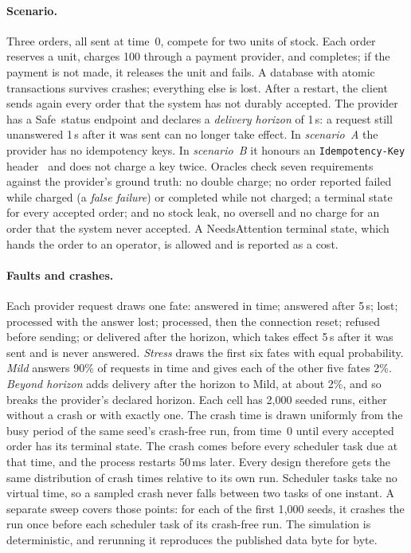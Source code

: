 \documentclass[11pt]{article}
\theoremstyle{definition}
\theoremstyle{plain}
\newcommand{\Safe}{\textsf{Safe}}
\begin{document}
\paragraph{Scenario.} Three orders, all sent at time~0, compete for two units of stock. Each order reserves a unit, charges 100 through a payment provider, and completes; if the payment is not made, it releases the unit and fails. A database with atomic transactions survives crashes; everything else is lost. After a restart, the client sends again every order that the system has not durably accepted. The provider has a \Safe\ status endpoint and declares a \emph{delivery horizon} of 1\,s: a request still unanswered 1\,s after it was sent can no longer take effect. In \emph{scenario~A} the provider has no idempotency keys. In \emph{scenario~B} it honours an \texttt{Idempotency-Key} header~\citep{IdempotencyKeyDraft} and does not charge a key twice. Oracles check seven requirements against the provider's ground truth: no double charge; no order reported failed while charged (a \emph{false failure}) or completed while not charged; a terminal state for every accepted order; and no stock leak, no oversell and no charge for an order that the system never accepted. A \textsf{NeedsAttention} terminal state, which hands the order to an operator, is allowed and is reported as a cost.

\paragraph{Faults and crashes.} Each provider request draws one fate: answered in time; answered after 5\,s; lost; processed with the answer lost; processed, then the connection reset; refused before sending; or delivered after the horizon, which takes effect 5\,s after it was sent and is never answered. \emph{Stress} draws the first six fates with equal probability. \emph{Mild} answers 90\% of requests in time and gives each of the other five fates 2\%. \emph{Beyond horizon} adds delivery after the horizon to Mild, at about 2\%, and so breaks the provider's declared horizon. Each cell has 2{,}000 seeded runs, either without a crash or with exactly one. The crash time is drawn uniformly from the busy period of the same seed's crash-free run, from time~0 until every accepted order has its terminal state. The crash comes before every scheduler task due at that time, and the process restarts 50\,ms later. Every design therefore gets the same distribution of crash times relative to its own run. Scheduler tasks take no virtual time, so a sampled crash never falls between two tasks of one instant. A separate sweep covers those points: for each of the first 1{,}000 seeds, it crashes the run once before each scheduler task of its crash-free run. The simulation is deterministic, and rerunning it reproduces the published data byte for byte.
\end{document}
